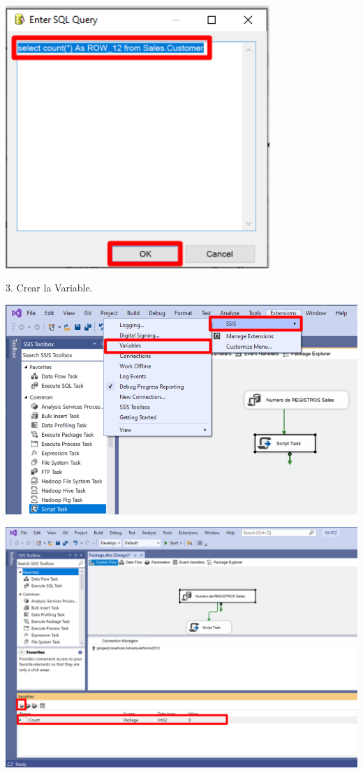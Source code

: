 \documentclass[12pt,letterpaper]{article}
\begin{document}
	\begin{center}
		\includegraphics[width=10cm]{./img/33}
		\vspace{2cm}
	\end{center}
3. Crear la Variable.	
	\begin{center}
	\includegraphics[width=16cm]{./img/35}
	\end{center}
	\begin{center}
		\includegraphics[width=16cm]{./img/36}
	\end{center}		
\end{document}
